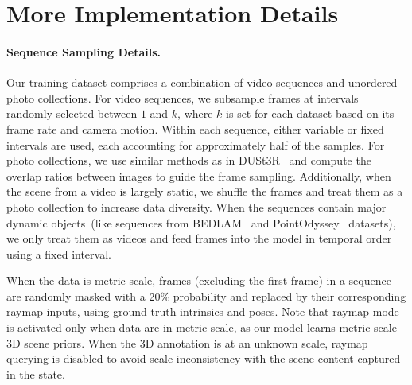 \section{More Implementation Details}

\paragraph{Sequence Sampling Details.}
Our training dataset comprises a combination of video sequences and unordered photo collections. For video sequences, we subsample frames at intervals randomly selected between $1$ and $k$, where $k$ is set for each dataset based on its frame rate and camera motion. Within each sequence, either variable or fixed intervals are used, each accounting for approximately half of the samples.
For photo collections, we use similar methods as in DUSt3R~\cite{wang2024dust3r} and compute the overlap ratios between images to guide the frame sampling. 
Additionally, when the scene from a video is largely static, we shuffle the frames and treat them as a photo collection to increase data diversity. When the sequences contain major dynamic objects~(like sequences from  BEDLAM~\cite{black2023bedlam} and PointOdyssey~\cite{zheng2023pointodyssey} datasets), we only treat them as videos and feed frames into the model in temporal order using a fixed interval.


When the data is metric scale, frames (excluding the first frame) in a sequence are randomly masked with a 20\% probability and replaced by their corresponding raymap inputs, using ground truth intrinsics and poses. Note that raymap mode is activated only when data are in metric scale, as our model learns metric-scale 3D scene priors. When the 3D annotation is at an unknown scale, raymap querying is disabled to avoid scale inconsistency with the scene content captured in the state.





